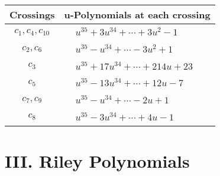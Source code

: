 \documentclass[1p]{elsarticle_modified}
\theoremstyle{definition}
\begin{document}
\begin{tabular}{m{50pt}|m{274pt}}
Crossings & \hspace{64pt}u-Polynomials at each crossing \\
\hline $$\begin{aligned}c_{1},c_{4},c_{10}\end{aligned}$$&$\begin{aligned}
&u^{35}+3 u^{34}+\cdots+3 u^2-1
\end{aligned}$\\
\hline $$\begin{aligned}c_{2},c_{6}\end{aligned}$$&$\begin{aligned}
&u^{35}- u^{34}+\cdots-3 u^2+1
\end{aligned}$\\
\hline $$\begin{aligned}c_{3}\end{aligned}$$&$\begin{aligned}
&u^{35}+17 u^{34}+\cdots+214 u+23
\end{aligned}$\\
\hline $$\begin{aligned}c_{5}\end{aligned}$$&$\begin{aligned}
&u^{35}-13 u^{34}+\cdots+12 u-7
\end{aligned}$\\
\hline $$\begin{aligned}c_{7},c_{9}\end{aligned}$$&$\begin{aligned}
&u^{35}- u^{34}+\cdots-2 u+1
\end{aligned}$\\
\hline $$\begin{aligned}c_{8}\end{aligned}$$&$\begin{aligned}
&u^{35}-3 u^{34}+\cdots+4 u-1
\end{aligned}$\\
\hline
\end{tabular}\newpage\renewcommand{\arraystretch}{1}
\centering \section*{ III. Riley Polynomials}
\end{document}
